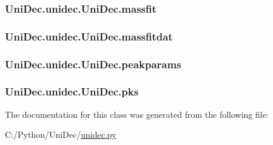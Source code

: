 \subsubsection[{massfit}]{\setlength{\rightskip}{0pt plus 5cm}Uni\+Dec.\+unidec.\+Uni\+Dec.\+massfit}\label{class_uni_dec_1_1unidec_1_1_uni_dec_a342644901005aaf3f7dd7dd89701976e}
\hypertarget{class_uni_dec_1_1unidec_1_1_uni_dec_a120ae2912e23a3078bbbe7a20544c05a}{}
\subsubsection[{massfitdat}]{\setlength{\rightskip}{0pt plus 5cm}Uni\+Dec.\+unidec.\+Uni\+Dec.\+massfitdat}\label{class_uni_dec_1_1unidec_1_1_uni_dec_a120ae2912e23a3078bbbe7a20544c05a}
\hypertarget{class_uni_dec_1_1unidec_1_1_uni_dec_a82f0bb441368fe7ba86423e7c2833bdd}{}
\subsubsection[{peakparams}]{\setlength{\rightskip}{0pt plus 5cm}Uni\+Dec.\+unidec.\+Uni\+Dec.\+peakparams}\label{class_uni_dec_1_1unidec_1_1_uni_dec_a82f0bb441368fe7ba86423e7c2833bdd}
\hypertarget{class_uni_dec_1_1unidec_1_1_uni_dec_ac3b8504e02825eb0c504efd7172973a4}{}
\subsubsection[{pks}]{\setlength{\rightskip}{0pt plus 5cm}Uni\+Dec.\+unidec.\+Uni\+Dec.\+pks}\label{class_uni_dec_1_1unidec_1_1_uni_dec_ac3b8504e02825eb0c504efd7172973a4}


The documentation for this class was generated from the following file\+:\begin{DoxyCompactItemize}
\item 
C\+:/\+Python/\+Uni\+Dec/\hyperlink{unidec_8py}{unidec.\+py}\end{DoxyCompactItemize}
